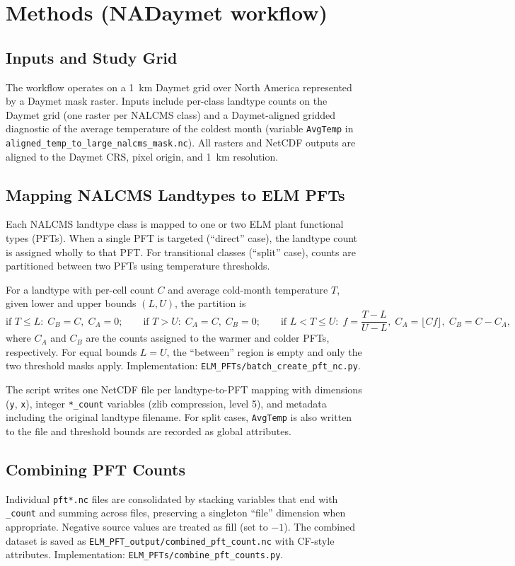 \section{Methods (NADaymet workflow)}

\subsection{Inputs and Study Grid}
The workflow operates on a 1~km Daymet grid over North America represented by a Daymet mask raster. Inputs include per-class landtype counts on the Daymet grid (one raster per NALCMS class) and a Daymet-aligned gridded diagnostic of the average temperature of the coldest month (variable \texttt{AvgTemp} in \texttt{aligned\_temp\_to\_large\_nalcms\_mask.nc}). All rasters and NetCDF outputs are aligned to the Daymet CRS, pixel origin, and 1~km resolution.

\subsection{Mapping NALCMS Landtypes to ELM PFTs}
Each NALCMS landtype class is mapped to one or two ELM plant functional types (PFTs). When a single PFT is targeted (``direct'' case), the landtype count is assigned wholly to that PFT. For transitional classes (``split'' case), counts are partitioned between two PFTs using temperature thresholds.

For a landtype with per-cell count \(C\) and average cold-month temperature \(T\), given lower and upper bounds \((L, U)\), the partition is
\[
  \text{if } T \le L:\; C_B = C,\; C_A = 0;\qquad
  \text{if } T > U:\; C_A = C,\; C_B = 0;\qquad
  \text{if } L < T \le U:\; f = \frac{T - L}{U - L},\; C_A = \lfloor C f \rfloor,\; C_B = C - C_A,
\]
where \(C_A\) and \(C_B\) are the counts assigned to the warmer and colder PFTs, respectively. For equal bounds \(L{=}U\), the ``between'' region is empty and only the two threshold masks apply. Implementation: \texttt{ELM\_PFTs/batch\_create\_pft\_nc.py}.

The script writes one NetCDF file per landtype-to-PFT mapping with dimensions (\texttt{y}, \texttt{x}), integer \texttt{*_count} variables (zlib compression, level 5), and metadata including the original landtype filename. For split cases, \texttt{AvgTemp} is also written to the file and threshold bounds are recorded as global attributes.

\subsection{Combining PFT Counts}
Individual \texttt{pft*.nc} files are consolidated by stacking variables that end with \texttt{\_count} and summing across files, preserving a singleton ``file'' dimension when appropriate. Negative source values are treated as fill (set to \(-1\)). The combined dataset is saved as \texttt{ELM\_PFT\_output/combined\_pft\_count.nc} with CF-style attributes. Implementation: \texttt{ELM\_PFTs/combine\_pft\_counts.py}.

